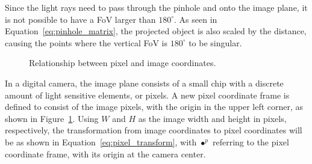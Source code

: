 Since the light rays need to pass through the pinhole and onto the image plane, it is not possible to have a FoV larger than $180^\circ$. As seen in Equation~\eqref{eq:pinhole_matrix}, the projected object is also scaled by the distance, causing the points where the vertical FoV is $180^\circ$ to be singular. 

\begin{figure}[!htb]
    \centering
    
    \caption{Relationship between pixel and image coordinates.}
    \label{fig:rel_img_pixel}
\end{figure}

In a digital camera, the image plane consists of a small chip with a discrete amount of light sensitive elements, or pixels. A new pixel coordinate frame is defined to consist of the image pixels, with the origin in the upper left corner, as shown in Figure~\ref{fig:rel_img_pixel}. Using $W$ and $H$ as the image width and height in pixels, respectively, the transformation from image coordinates to pixel coordinates will be as shown in Equation~\eqref{eq:pixel_transform}, with $\bullet^p$ referring to the pixel coordinate frame, with its origin at the camera center.

